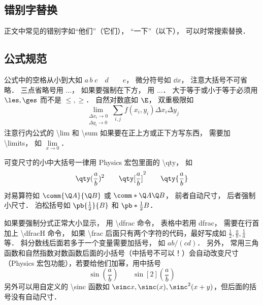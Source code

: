 \subsection{错别字替换}
正文中常见的错别字如“他们”（它们）， “一下”（以下）， 可以时常搜索替换．

\subsection{公式规范}
公式中的空格从小到大如 $a\, b\; c\quad d\qquad e$， 微分符号如 $\dd{x}$， 注意大括号不可省略． 三点省略号用 $\dots$， 如果要强制在下方， 用 $\ldots$． 大于等于或小于等于必须用 $\les, \ges$ 而不是 $\le, \ge$． 自然对数底如 $\E$， 双重极限如
\begin{equation}
\lim_{\substack{\Delta x_i\to 0\\ \Delta y_i\to 0}} \sum_{i, j} f(x_i,y_i) \Delta x_i \Delta y_j
\end{equation}
注意行内公式的 \textbackslash lim 和 \textbackslash sum 如果要在正上方或正下方写东西， 需要加 \textbackslash limits， 如 $\lim\limits_{x\to 0}$．

可变尺寸的小中大括号一律用 Physics 宏包里面的 \textbackslash qty， 如
\begin{equation}
\qty(\frac ab)^2 \qquad \qty[\frac ab]^2 \qquad \qty{ \frac ab}
\end{equation}
对易算符如 $\comm{\Q A}{\Q B}$ 或 $\comm*{\Q A}{\Q B}$， 前者自动尺寸， 后者强制小尺寸． 泊松括号如 $\pb{\frac12}{B}$ 和 $\pb*{\frac12}{B}$．

如果要强制分式正常大小显示， 用 \textbackslash dfrac 命令， 表格中若用 dfrac， 需要在行首加上 \textbackslash dfracH 命令， 如果 \textbackslash frac 后面只有两个字符的代码，最好写成如 $\frac12, \frac ab, \frac1a$ 等． 斜分数线后面若多于一个变量需要加括号， 如 $ab/(cd)$． 另外， 常用三角函数和自然指数对数函数后面的小括号（中括号不可以！）会自动改变尺寸（Physics 宏包功能），若要给他们加幂，用中括号
\begin{equation}
\sin(\frac ab) \qquad \sin[2](\frac ab)
\end{equation}
另外可以用自定义的 \textbackslash sinc 函数如 $\sinc x, \sinc(x), \sinc^2(x+y)$，但后面的括号没有自动尺寸．

